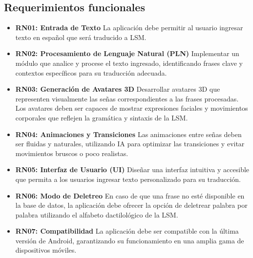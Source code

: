 \subsection{Requerimientos funcionales}
\begin{itemize}
    \item \textbf{RN01: Entrada de Texto}  
    La aplicación debe permitir al usuario ingresar texto en español que será traducido a LSM.
    
    \item \textbf{RN02: Procesamiento de Lenguaje Natural (PLN)}  
    Implementar un módulo que analice y procese el texto ingresado, identificando frases clave y contextos específicos para su traducción adecuada.
    
    \item \textbf{RN03: Generación de Avatares 3D}  
    Desarrollar avatares 3D que representen visualmente las señas correspondientes a las frases procesadas. Los avatares deben ser capaces de mostrar expresiones faciales y movimientos corporales que reflejen la gramática y sintaxis de la LSM.
    
    \item \textbf{RN04: Animaciones y Transiciones}  
    Las animaciones entre señas deben ser fluidas y naturales, utilizando IA para optimizar las transiciones y evitar movimientos bruscos o poco realistas.
    
    \item \textbf{RN05: Interfaz de Usuario (UI)}  
    Diseñar una interfaz intuitiva y accesible que permita a los usuarios ingresar texto personalizado para su traducción.
    
    \item \textbf{RN06: Modo de Deletreo}  
    En caso de que una frase no esté disponible en la base de datos, la aplicación debe ofrecer la opción de deletrear palabra por palabra utilizando el alfabeto dactilológico de la LSM.
    
    \item \textbf{RN07: Compatibilidad}  
    La aplicación debe ser compatible con la última versión de Android, garantizando su funcionamiento en una amplia gama de dispositivos móviles.
\end{itemize}

